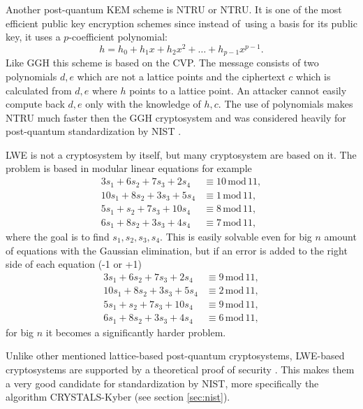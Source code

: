 Another post-quantum KEM scheme is NTRU or \acl{NTRU}. It is one of the most efficient public key encryption schemes since instead of~using a basis for  its public key, it uses a $p$-coefficient polynomial:
\begin{equation}
  h=h_0+h_1x+h_2x^2+\dots+h_{p-1}x^{p-1}.
\end{equation}
Like GGH this scheme is based on the CVP. The message consists of two polynomials $d, e$ which are not a lattice points and the ciphertext $c$ which is calculated from $d, e$ where $h$ points to a lattice point. An attacker cannot easily compute back $d, e$ only with the knowledge of $h, c$. The use of polynomials makes NTRU much faster then the GGH cryptosystem and was considered heavily for post-quantum standardization by NIST \cite{Bernstein149}.

LWE is not a cryptosystem by itself, but many cryptosystem are based on it. The problem is based in modular linear equations for example
\begin{align}
  3s_1+6s_2+7s_3+2s_4&\equiv 10\,\mathrm{mod}\,11,\\
  10s_1+8s_2+3s_3+5s_4&\equiv 1\,\mathrm{mod}\,11,\\
  5s_1+s_2+7s_3+10s_4&\equiv 8\,\mathrm{mod}\,11,\\
  6s_1+8s_2+3s_3+4s_4&\equiv 7\,\mathrm{mod}\,11,
\end{align}
where the goal is to find $s_1, s_2, s_3, s_4$. This is easily solvable even for big $n$ amount of equations with the Gaussian elimination, but if an error is added to the right side of each equation (-1 or +1)
\begin{align}
  3s_1+6s_2+7s_3+2s_4&\equiv 9\,\mathrm{mod}\,11,\\
  10s_1+8s_2+3s_3+5s_4&\equiv 2\,\mathrm{mod}\,11,\\
  5s_1+s_2+7s_3+10s_4&\equiv 9\,\mathrm{mod}\,11,\\
  6s_1+8s_2+3s_3+4s_4&\equiv 6\,\mathrm{mod}\,11,
\end{align}
for big $n$ it becomes a significantly harder problem. \cite{Regev2005}

Unlike other mentioned lattice-based post-quantum cryptosystems, LWE-based cryptosystems are supported by a theoretical proof of security \cite{Bernstein2009}. This makes them a very good candidate for standardization by NIST, more specifically the algorithm CRYSTALS-Kyber (see section \ref{sec:nist}).
